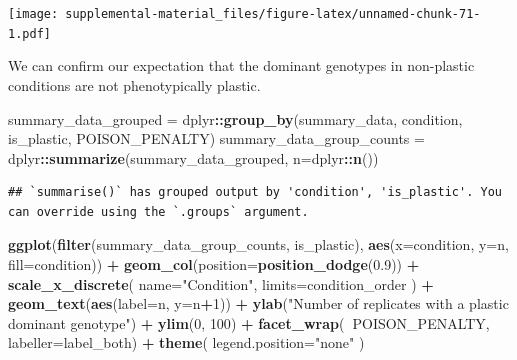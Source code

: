 \documentclass[]{book}
\newenvironment{Shaded}{\begin{snugshade}}{\end{snugshade}}
\newcommand{\DataTypeTok}[1]{\textcolor[rgb]{0.13,0.29,0.53}{#1}}
\newcommand{\DecValTok}[1]{\textcolor[rgb]{0.00,0.00,0.81}{#1}}
\newcommand{\FloatTok}[1]{\textcolor[rgb]{0.00,0.00,0.81}{#1}}
\newcommand{\KeywordTok}[1]{\textcolor[rgb]{0.13,0.29,0.53}{\textbf{#1}}}
\newcommand{\NormalTok}[1]{#1}
\newcommand{\OperatorTok}[1]{\textcolor[rgb]{0.81,0.36,0.00}{\textbf{#1}}}
\newcommand{\StringTok}[1]{\textcolor[rgb]{0.31,0.60,0.02}{#1}}
\begin{document}
\texttt{[image: supplemental-material\_files/figure-latex/unnamed-chunk-71-1.pdf]}

We can confirm our expectation that the dominant genotypes in non-plastic conditions are not phenotypically plastic.

\begin{Shaded}
\begin{Highlighting}[]
\NormalTok{summary_data_grouped =}\StringTok{ }\NormalTok{dplyr}\OperatorTok{::}\KeywordTok{group_by}\NormalTok{(summary_data, condition, is_plastic, POISON_PENALTY)}
\NormalTok{summary_data_group_counts =}\StringTok{ }\NormalTok{dplyr}\OperatorTok{::}\KeywordTok{summarize}\NormalTok{(summary_data_grouped, }\DataTypeTok{n=}\NormalTok{dplyr}\OperatorTok{::}\KeywordTok{n}\NormalTok{())}
\end{Highlighting}
\end{Shaded}

\begin{verbatim}
## `summarise()` has grouped output by 'condition', 'is_plastic'. You can override using the `.groups` argument.
\end{verbatim}

\begin{Shaded}
\begin{Highlighting}[]
\KeywordTok{ggplot}\NormalTok{(}\KeywordTok{filter}\NormalTok{(summary_data_group_counts, is_plastic), }\KeywordTok{aes}\NormalTok{(}\DataTypeTok{x=}\NormalTok{condition, }\DataTypeTok{y=}\NormalTok{n, }\DataTypeTok{fill=}\NormalTok{condition)) }\OperatorTok{+}
\StringTok{  }\KeywordTok{geom_col}\NormalTok{(}\DataTypeTok{position=}\KeywordTok{position_dodge}\NormalTok{(}\FloatTok{0.9}\NormalTok{)) }\OperatorTok{+}
\StringTok{  }\KeywordTok{scale_x_discrete}\NormalTok{(}
    \DataTypeTok{name=}\StringTok{"Condition"}\NormalTok{,}
    \DataTypeTok{limits=}\NormalTok{condition_order}
\NormalTok{  ) }\OperatorTok{+}
\StringTok{  }\KeywordTok{geom_text}\NormalTok{(}\KeywordTok{aes}\NormalTok{(}\DataTypeTok{label=}\NormalTok{n, }\DataTypeTok{y=}\NormalTok{n}\OperatorTok{+}\DecValTok{1}\NormalTok{)) }\OperatorTok{+}
\StringTok{  }\KeywordTok{ylab}\NormalTok{(}\StringTok{"Number of replicates with a plastic dominant genotype"}\NormalTok{) }\OperatorTok{+}
\StringTok{  }\KeywordTok{ylim}\NormalTok{(}\DecValTok{0}\NormalTok{, }\DecValTok{100}\NormalTok{) }\OperatorTok{+}
\StringTok{  }\KeywordTok{facet_wrap}\NormalTok{(}\OperatorTok{~}\NormalTok{POISON_PENALTY, }\DataTypeTok{labeller=}\NormalTok{label_both) }\OperatorTok{+}
\StringTok{  }\KeywordTok{theme}\NormalTok{(}
    \DataTypeTok{legend.position=}\StringTok{"none"}
\NormalTok{  )}
\end{Highlighting}
\end{Shaded}
\end{document}
